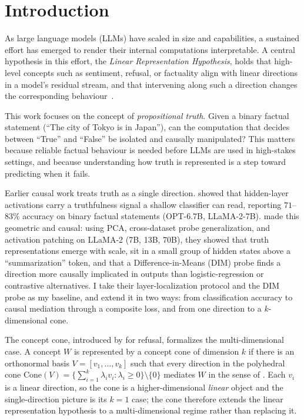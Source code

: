 \documentclass[sn-basic]{sn-jnl}
\begin{document}



\section{Introduction}
\label{sec:intro}

As large language models (LLMs) have scaled in size and capabilities, a
sustained effort has emerged to render their internal computations
interpretable. A central hypothesis in this effort, the \emph{Linear
Representation Hypothesis}, holds that high-level concepts such as sentiment,
refusal, or factuality align with linear directions in a model's residual
stream, and that intervening along such a direction changes the corresponding
behaviour~\citep{parkLinearRepresentationHypothesis2024}.

This work focuses on the concept of \emph{propositional truth}. Given a
binary factual statement (``The city of Tokyo is in Japan''), can the
computation that decides between ``True'' and ``False'' be isolated and causally
manipulated? This matters because reliable factual behaviour is needed before
LLMs are used in high-stakes settings, and because understanding how truth is
represented is a step toward predicting when it fails.

Earlier causal work treats truth as a single direction.
\citet{azariaInternalStateLLM2023} showed that hidden-layer activations carry a
truthfulness signal a shallow classifier can read, reporting $71$--$83$\%
accuracy on binary factual statements (OPT-6.7B, LLaMA-2-7B).
\citet{marksGeometryTruthEmergent2024} made this geometric and causal: using
PCA, cross-dataset probe generalization, and activation patching on LLaMA-2 (7B,
13B, 70B), they showed that truth representations emerge with scale, sit in a
small group of hidden states above a ``summarization'' token, and that a
Difference-in-Means (DIM) probe finds a direction more causally implicated in
outputs than logistic-regression or contrastive alternatives. I take their
layer-localization protocol and the DIM probe as my baseline, and extend it in
two ways: from classification accuracy to causal mediation through a composite
loss, and from one direction to a $k$-dimensional cone.

The concept cone, introduced by \citet{wollschlagerGeometryRefusalLarge2025} for
refusal, formalizes the multi-dimensional case. A concept $W$ is represented by
a concept cone of dimension $k$ if there is an orthonormal basis $V = [v_1,
\ldots, v_k]$ such that every direction in the polyhedral cone $\mathrm{Cone}(V)
= \{\sum_{i=1}^{k} \lambda_i v_i : \lambda_i \ge 0\} \setminus \{0\}$ mediates
$W$ in the sense of . Each $v_i$ is a linear direction, so the
cone is a higher-dimensional \emph{linear} object and the single-direction
picture is its $k=1$ case; the cone therefore extends the linear representation
hypothesis to a multi-dimensional regime rather than replacing it.
\end{document}
